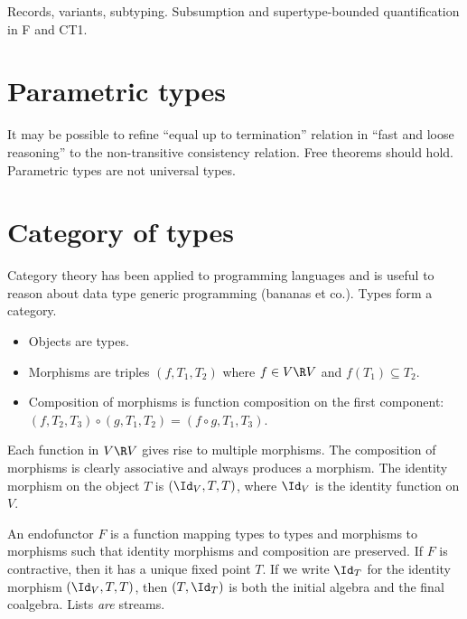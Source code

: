 \documentclass{amsart}
\theoremstyle{definition}
\begin{document}
Records, variants, subtyping. Subsumption and supertype-bounded
quantification in F and CT1.


\section{Parametric types}

It may be possible to refine ``equal up to termination'' relation
in ``fast and loose reasoning'' to the non-transitive consistency
relation. Free theorems should hold. Parametric types are not
universal types.


\section{Category of types}
\label{hask}

Category theory has been applied to programming languages and is
useful to reason about data type generic programming (bananas et
co.). Types form a category.
\begin{itemize}
\item Objects are types.
\item Morphisms are triples $(f,T_1, T_2)$ where $f\in V\R V$ and
$f(T_1)\subseteq T_2$.
\item Composition of morphisms is function composition on the
first component:\\
$(f,T_2,T_3)\circ(g, T_1, T_2)=(f\circ g,T_1,T_3)$.
\end{itemize}
Each function in $V\R V$ gives rise to multiple morphisms. The
composition of morphisms is clearly associative and always
produces a morphism. The identity morphism on the object $T$ is
$(\Id_V, T, T)$, where $\Id_V$ is the identity function on $V$.

An endofunctor $F$ is a function mapping types to types and
morphisms to morphisms such that identity morphisms and
composition are preserved. If $F$ is contractive, then it has a
unique fixed point $T$. If we write $\Id_T$ for the identity
morphism $(\Id_V, T, T)$, then $(T,\Id_T)$ is both the initial
algebra and the final coalgebra. Lists \emph{are} streams.
\end{document}
